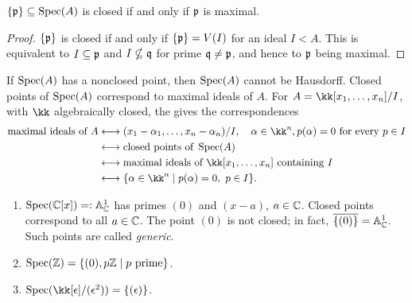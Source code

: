 \documentclass[11pt,a4paper]{article}
\begin{document}
\setcounter{theorem}{30}\begin{lemma}
$\{\mathfrak p\}\subseteq\operatorname{Spec}(A)$ is closed if and only if $\mathfrak p$ is maximal.
\end{lemma}
\begin{proof}
$\{\mathfrak p\}$ is closed if and only if $\{\mathfrak p\}=V(I)$ for an ideal $I<A$. This is equivalent to $I\subseteq\mathfrak p$ and $I\nsubseteq\mathfrak q$ for prime $\mathfrak q\ne\mathfrak p$, and hence to $\mathfrak p$ being maximal.
\end{proof}
\begin{remark}
If $\operatorname{Spec}(A)$ has a nonclosed point, then $\operatorname{Spec}(A)$ cannot be Hausdorff. Closed points of $\operatorname{Spec}(A)$ correspond to maximal ideals of $A$.
For $A=\kk[x_1,\ldots,x_n]/I$, with $\kk$ algebraically closed, the  gives the correspondences
\[
\begin{aligned}
\text{maximal ideals of }A
&\longleftrightarrow(x_1-\alpha_1,\ldots,x_n-\alpha_n)/I,
\quad\alpha\in\kk^n, p(\alpha)=0\text{ for every }p\in I\\
&\longleftrightarrow\text{closed points of }\Spec(A)\\
&\longleftrightarrow\text{maximal ideals of }\kk[x_1,\ldots,x_n]\text{ containing }I\\
&\longleftrightarrow\{\alpha\in\kk^n\mid p(\alpha)=0,\ p\in I\}.
\end{aligned}
\]
\end{remark}
\setcounter{example}{9}\begin{example}
\begin{enumerate}[label=(\roman*)]
\setcounter{enumi}{0}\item $\operatorname{Spec}(\mathbb{C}[x])=:\mathbb A^1_{\mathbb{C}}$ has primes $(0)$ and $(x-a)$, $a\in\mathbb{C}$. Closed points correspond to all $a\in\mathbb{C}$. The point $(0)$ is not closed; in fact, $\overline{\{(0)\}}=\mathbb A^1_{\mathbb{C}}$. Such points are called \emph{generic}.
\setcounter{enumi}{1}\item $\operatorname{Spec}(\mathbb{Z})=\{(0),p\mathbb{Z}\mid p\text{ prime}\}$.
\setcounter{enumi}{2}\item $\Spec(\kk[\epsilon]/(\epsilon^2))=\{(\epsilon)\}$.
\end{enumerate}
\end{example}
\end{document}
